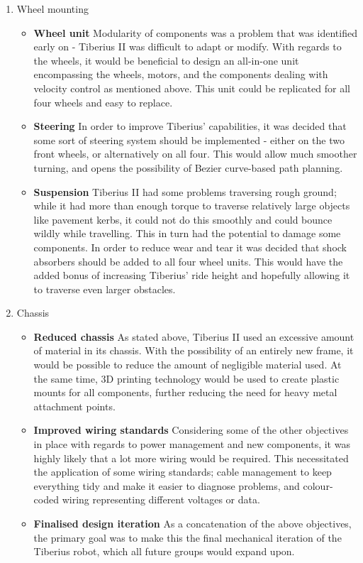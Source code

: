\begin{enumerate}
\item Wheel mounting
\begin{itemize}
\item \textbf{Wheel unit}
\newline
Modularity of components was a problem that was identified early on - Tiberius II was difficult to adapt or modify. With regards to the wheels, it would be beneficial to design an all-in-one unit encompassing the wheels, motors, and the components dealing with velocity control as mentioned above. This unit could be replicated for all four wheels and easy to replace.
\item \textbf{Steering}
\newline
In order to improve Tiberius' capabilities, it was decided that some sort of steering system should be implemented - either on the two front wheels, or alternatively on all four. This would allow much smoother turning, and opens the possibility of Bezier curve-based path planning.\cite{Dun_bezier}
\item \textbf{Suspension}
\newline
Tiberius II had some problems traversing rough ground; while it had more than enough torque to traverse relatively large objects like pavement kerbs, it could not do this smoothly and could bounce wildly while travelling. This in turn had the potential to damage some components. In order to reduce wear and tear it was decided that shock absorbers should be added to all four wheel units. This would have the added bonus of increasing Tiberius' ride height and hopefully allowing it to traverse even larger obstacles.
\end{itemize}

\item Chassis
\begin{itemize}
\item \textbf{Reduced chassis}
\newline
As stated above, Tiberius II used an excessive amount of material in its chassis. With the possibility of an entirely new frame, it would be possible to reduce the amount of negligible material used. At the same time, 3D printing technology would be used to create plastic mounts for all components, further reducing the need for heavy metal attachment points.
\item \textbf{Improved wiring standards}
\newline
Considering some of the other objectives in place with regards to power management and new components, it was highly likely that a lot more wiring would be required. This necessitated the application of some wiring standards; cable management to keep everything tidy and make it easier to diagnose problems, and colour-coded wiring representing different voltages or data.
\item \textbf{Finalised design iteration}
\newline
As a concatenation of the above objectives, the primary goal was to make this the final mechanical iteration of the Tiberius robot, which all future groups would expand upon.
\end{itemize}
\end{enumerate}